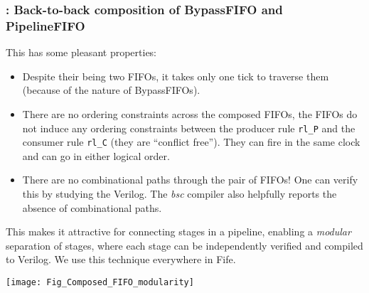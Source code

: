 \begin{frame}[fragile]
\frametitle{{\BSV}: Back-to-back composition of BypassFIFO and PipelineFIFO}

\label{Slide_FIFO_Composition}

\footnotesize

This has some pleasant properties:

\vspace{1ex}

\begin{itemize}

 \item Despite their being two FIFOs, it takes only one tick to
        traverse them (because of the nature of BypassFIFOs).

 \PAUSE{\vspace{1ex}}

 \item There are no ordering constraints across the composed FIFOs,
       {\ie} the FIFOs do not induce any ordering constraints between
       the producer rule \verb|rl_P| and the consumer rule \verb|rl_C|
       (they are ``conflict free'').  They can fire in the same clock
       and can go in either logical order.

 \PAUSE{\vspace{1ex}}

 \item There are no combinational paths through the pair of FIFOs!
       One can verify this by studying the Verilog.  The \emph{bsc}
       compiler also helpfully reports the absence of combinational
       paths.

\end{itemize}

\PAUSE{\vspace{5ex}}

\begin{minipage}{0.37\textwidth}
This makes it attractive for connecting stages in a pipeline, enabling
a \emph{modular} separation of stages, where each stage can be
independently verified and compiled to Verilog. We use this technique
everywhere in Fife.
\end{minipage}
\hfill
\begin{minipage}{0.6\textwidth}
  \texttt{[image: Fig\_Composed\_FIFO\_modularity]}
\end{minipage}

\end{frame}


